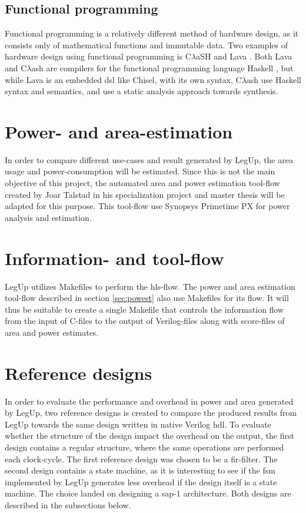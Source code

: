 \subsection{Functional programming}
Functional programming is a relatively different method of hardware design, as it consists only of mathematical functions and immutable data. Two examples of hardware design using functional programming is C$\lambda$aSH \cite{baaij2009clash} and Lava \cite{bjesse1998lava}. Both Lava and C$\lambda$ash are compilers for the functional programming language Haskell \cite{haskellonline}, but while Lava is an embedded \gls{dsl} like Chisel, with its own syntax, C$\lambda$ash use Haskell syntax and semantics, and use a static analysis approach towards synthesis.

\section{\label{sec:powest}Power- and area-estimation}
In order to compare different use-cases and result generated by LegUp, the area usage and power-consumption will be estimated. Since this is not the main objective of this project, the automated area and power estimation tool-flow created by Joar Talstad in his specialization project \cite{talstad14project} and master thesis \cite{talstad15master} will be adapted for this purpose. This tool-flow use Synopsys Primetime PX for power analysis and estimation.

\section{Information- and tool-flow}
LegUp utilizes Makefiles to perform the \gls{hls}-flow. The power and area estimation tool-flow described in section \ref{sec:powest} also use Makefiles for its flow. It will thus be suitable to create a single Makefile that controls the information flow from the input of C-files to the output of Verilog-files along with score-files of area and power estimates. 

\section{Reference designs}
\label{sec:refdes}
In order to evaluate the performance and overhead in power and area generated by LegUp, two reference designs is created to compare the produced results from LegUp towards the same design written in native Verilog \gls{hdl}. To evaluate whether the structure of the design impact the overhead on the output, the first design contains a regular structure, where the same operations are performed each clock-cycle. The first reference design was chosen to be a \gls{fir}-filter. The second design contains a state machine, as it is interesting to see if the \gls{fsm} implemented by LegUp generates less overhead if the design itself is a state machine. The choice landed on designing a \gls{sap-1} architecture. Both designs are described in the subsections below.

